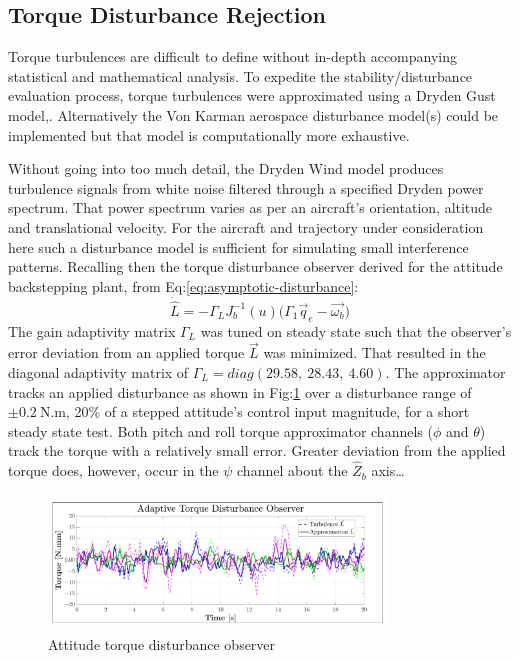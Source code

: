 \subsection{Torque Disturbance Rejection}
\label{subsec:simulation.disturbance.torque}
Torque turbulences are difficult to define without in-depth accompanying statistical and mathematical analysis. To expedite the stability/disturbance evaluation process, torque turbulences were approximated using a Dryden Gust model,\cite{optimalgust,discretegustmodel}. Alternatively the Von Karman aerospace disturbance model(s) could be implemented but that model is computationally more exhaustive.
\par
Without going into too much detail, the Dryden Wind model produces turbulence signals from white noise filtered through a specified Dryden power spectrum. That power spectrum varies as per an aircraft's orientation, altitude and translational velocity. For the aircraft and trajectory under consideration here such a disturbance model is sufficient for simulating small interference patterns. Recalling then the torque disturbance observer derived for the attitude backstepping plant, from Eq:\ref{eq:asymptotic-disturbance}:
\begin{equation}\label{eq:stability-torque-overserver}
\dot{\hat{L}}=-\Gamma_L J_b^{-1}(u)\big(\Gamma_1\vec{q}_e-\vec{\omega_b}\big)
\end{equation}
The gain adaptivity matrix $\Gamma_L$ was tuned on steady state such that the observer's error deviation from an applied torque $\vec{L}$ was minimized. That resulted in the diagonal adaptivity matrix of $\Gamma_L=diag(29.58,~28.43,~4.60)$. The approximator tracks an applied disturbance as shown in Fig:\ref{fig:torque-observer} over a disturbance range of $\pm 0.2~\text{N.m}$, 20\% of a stepped attitude's control input magnitude, for a short steady state test. Both pitch and roll torque approximator channels ($\phi$ and $\theta$) track the torque with a relatively small error. Greater deviation from the applied torque does, however, occur in the $\psi$ channel about the $\hat{Z}_b$ axis\ldots
\begin{figure}[htbp]
\vspace{-12pt}
\centering
\includegraphics[width=0.8\textwidth]{graphs/torque-observer}
\vspace{-12pt}
\caption{Attitude torque disturbance observer}
\vspace{-16pt}
\label{fig:torque-observer}
\end{figure}
